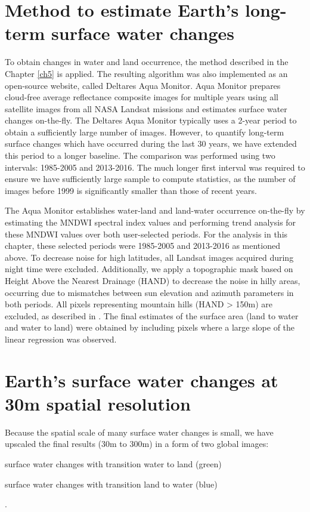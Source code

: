 \section{Method to estimate Earth's long-term surface water changes}
To obtain changes in water and land occurrence, the method described in the Chapter \ref{ch5} is applied. The resulting algorithm was also implemented as an open-source website, called Deltares Aqua Monitor. Aqua Monitor prepares cloud-free average reflectance composite images for multiple years using all satellite images from all NASA Landsat missions and estimates surface water changes on-the-fly. The Deltares Aqua Monitor typically uses a 2-year period to obtain a sufficiently large number of images. However, to quantify long-term surface changes which have occurred during the last 30 years, we have extended this period to a longer baseline. The comparison was performed using two intervals: 1985-2005 and 2013-2016. The much longer first interval was required to ensure we have sufficiently large sample to compute statistics, as the number of images before 1999 is significantly smaller than those of recent years.

The Aqua Monitor establishes water-land and land-water occurrence on-the-fly by estimating the \gls{MNDWI} spectral index values and performing trend analysis for these \gls{MNDWI} values over both user-selected periods. For the analysis in this chapter, these selected periods were 1985-2005 and 2013-2016 as mentioned above. To decrease noise for high latitudes, all Landsat images acquired during night time were excluded. Additionally, we apply a topographic mask based on Height Above the Nearest Drainage (\gls{HAND}) to decrease the noise in hilly areas, occurring due to mismatches between sun elevation and azimuth parameters in both periods. All pixels representing mountain hills (HAND > 150m) are excluded, as described in \cite{donchyts2016imdp}. The final estimates of the surface area (land to water and water to land) were obtained by including pixels where a large slope of the linear regression was observed.  

\section{Earth's surface water changes at 30m spatial resolution}

Because the spatial scale of many surface water changes is small, we have upscaled the final results (30m to 300m) in a form of two global images: \begin{enumerate*}[label=(\emph{\alph*})]
	\item surface water changes with transition water to land (green)
	\item surface water changes with transition land to water (blue)
\end{enumerate*}.

